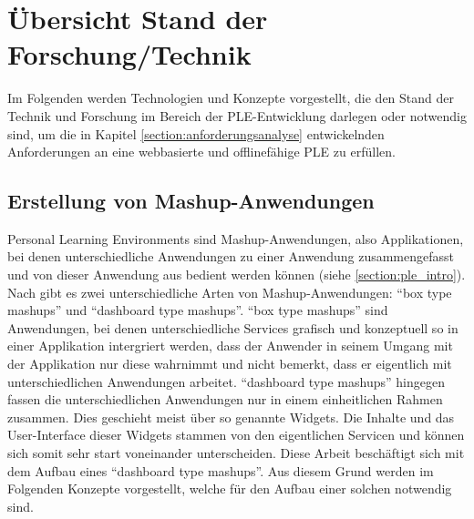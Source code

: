 \chapter{Übersicht Stand der Forschung/Technik} 
\label{Kapitel 4}

Im Folgenden werden Technologien und Konzepte vorgestellt, die den Stand der Technik und Forschung im Bereich der PLE-Entwicklung darlegen oder notwendig sind, um die in Kapitel \ref{section:anforderungsanalyse} entwickelnden Anforderungen an eine webbasierte und offlinefähige PLE zu erfüllen.

\section{Erstellung von Mashup-Anwendungen}
Personal Learning Environments sind Mashup-Anwendungen, also Applikationen, bei denen unterschiedliche Anwendungen zu einer Anwendung zusammengefasst und von dieser Anwendung aus bedient werden können (siehe \ref{section:ple_intro}). Nach \cite{Soylu2011} gibt es zwei unterschiedliche Arten von Mashup-Anwendungen: "`box type mashups"' und "`dashboard type mashups"'. "`box type mashups"' sind Anwendungen, bei denen unterschiedliche Services grafisch und konzeptuell so in einer Applikation intergriert werden, dass der Anwender in seinem Umgang mit der Applikation nur diese wahrnimmt und nicht bemerkt, dass er eigentlich mit unterschiedlichen Anwendungen arbeitet. "`dashboard type mashups"' hingegen fassen die unterschiedlichen Anwendungen nur in einem einheitlichen Rahmen zusammen. Dies geschieht meist über so genannte Widgets. Die Inhalte und das User-Interface dieser Widgets stammen von den eigentlichen Servicen und können sich somit sehr start voneinander unterscheiden. Diese Arbeit beschäftigt sich mit dem Aufbau eines "`dashboard type mashups"'. Aus diesem Grund werden im Folgenden Konzepte vorgestellt, welche für den Aufbau einer solchen notwendig sind. 

